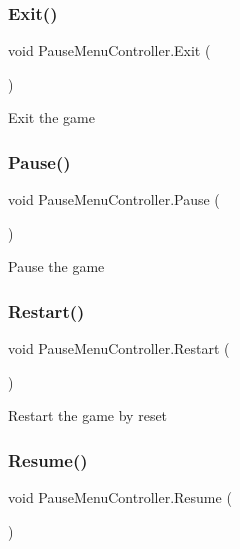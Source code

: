\subsubsection{\texorpdfstring{Exit()}{Exit()}}
{\footnotesize\ttfamily void Pause\+Menu\+Controller.\+Exit (\begin{DoxyParamCaption}{ }\end{DoxyParamCaption})}

Exit the game \mbox{\label{class_pause_menu_controller_a3906c8f1f6638758d0ec23baa3920119}} 
\subsubsection{\texorpdfstring{Pause()}{Pause()}}
{\footnotesize\ttfamily void Pause\+Menu\+Controller.\+Pause (\begin{DoxyParamCaption}{ }\end{DoxyParamCaption})}

Pause the game \mbox{\label{class_pause_menu_controller_a6589e248ee8b466d85c042144e88ab20}} 
\subsubsection{\texorpdfstring{Restart()}{Restart()}}
{\footnotesize\ttfamily void Pause\+Menu\+Controller.\+Restart (\begin{DoxyParamCaption}{ }\end{DoxyParamCaption})}

Restart the game by reset \mbox{\label{class_pause_menu_controller_a4048ec517af3d52f890c2f6153287779}} 
\subsubsection{\texorpdfstring{Resume()}{Resume()}}
{\footnotesize\ttfamily void Pause\+Menu\+Controller.\+Resume (\begin{DoxyParamCaption}{ }\end{DoxyParamCaption})}

